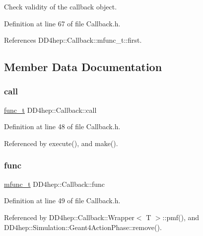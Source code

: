 Check validity of the callback object. 



Definition at line 67 of file Callback.\+h.



References D\+D4hep\+::\+Callback\+::mfunc\+\_\+t\+::first.



\subsection{Member Data Documentation}
\hypertarget{class_d_d4hep_1_1_callback_af278c88d3680465912b88ad74b0d4cff}{}\label{class_d_d4hep_1_1_callback_af278c88d3680465912b88ad74b0d4cff} 
\subsubsection{\texorpdfstring{call}{call}}
{\footnotesize\ttfamily \hyperlink{class_d_d4hep_1_1_callback_a1f07e4c890067fde0b3ff1ad94e72a34}{func\+\_\+t} D\+D4hep\+::\+Callback\+::call}



Definition at line 48 of file Callback.\+h.



Referenced by execute(), and make().

\hypertarget{class_d_d4hep_1_1_callback_a9998721dd74f6377d4c5e71629411426}{}\label{class_d_d4hep_1_1_callback_a9998721dd74f6377d4c5e71629411426} 
\subsubsection{\texorpdfstring{func}{func}}
{\footnotesize\ttfamily \hyperlink{struct_d_d4hep_1_1_callback_1_1mfunc__t}{mfunc\+\_\+t} D\+D4hep\+::\+Callback\+::func}



Definition at line 49 of file Callback.\+h.



Referenced by D\+D4hep\+::\+Callback\+::\+Wrapper$<$ T $>$\+::pmf(), and D\+D4hep\+::\+Simulation\+::\+Geant4\+Action\+Phase\+::remove().

\hypertarget{class_d_d4hep_1_1_callback_a0a6ca86dc357627c3c8e9f6233444733}{}\label{class_d_d4hep_1_1_callback_a0a6ca86dc357627c3c8e9f6233444733} 
